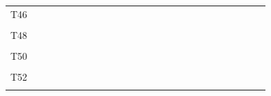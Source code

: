 \documentclass[
]{article}
\begin{document}
\begin{longtable}[l]{lllllllllllllllllllllllll}
\addlinespace
T46 &  &  &  &  &  &  &  &  &  &  &  &  &  &  &  &  &  &  &  &  &  &  &  & \\
\cellcolor{gray!6}{T47} & \cellcolor{gray!6}{} & \cellcolor{gray!6}{} & \cellcolor{gray!6}{} & \cellcolor{gray!6}{} & \cellcolor{gray!6}{} & \cellcolor{gray!6}{} & \cellcolor{gray!6}{} & \cellcolor{gray!6}{} & \cellcolor{gray!6}{} & \cellcolor{gray!6}{} & \cellcolor{gray!6}{} & \cellcolor{gray!6}{} & \cellcolor{gray!6}{} & \cellcolor{gray!6}{} & \cellcolor{gray!6}{} & \cellcolor{gray!6}{} & \cellcolor{gray!6}{} & \cellcolor{gray!6}{} & \cellcolor{gray!6}{} & \cellcolor{gray!6}{} & \cellcolor{gray!6}{} & \cellcolor{gray!6}{} & \cellcolor{gray!6}{} & \cellcolor{gray!6}{}\\
T48 &  &  &  &  &  &  &  &  &  &  &  &  &  &  &  &  &  &  &  &  &  &  &  & \\
\cellcolor{gray!6}{T49} & \cellcolor{gray!6}{} & \cellcolor{gray!6}{} & \cellcolor{gray!6}{} & \cellcolor{gray!6}{} & \cellcolor{gray!6}{} & \cellcolor{gray!6}{} & \cellcolor{gray!6}{} & \cellcolor{gray!6}{} & \cellcolor{gray!6}{} & \cellcolor{gray!6}{} & \cellcolor{gray!6}{} & \cellcolor{gray!6}{} & \cellcolor{gray!6}{} & \cellcolor{gray!6}{} & \cellcolor{gray!6}{} & \cellcolor{gray!6}{} & \cellcolor{gray!6}{} & \cellcolor{gray!6}{} & \cellcolor{gray!6}{} & \cellcolor{gray!6}{} & \cellcolor{gray!6}{} & \cellcolor{gray!6}{} & \cellcolor{gray!6}{} & \cellcolor{gray!6}{}\\
T50 &  &  &  &  &  &  &  &  &  &  &  &  &  &  &  &  &  &  &  &  &  &  &  & \\
\addlinespace
\cellcolor{gray!6}{T51} & \cellcolor{gray!6}{} & \cellcolor{gray!6}{} & \cellcolor{gray!6}{} & \cellcolor{gray!6}{} & \cellcolor{gray!6}{} & \cellcolor{gray!6}{} & \cellcolor{gray!6}{} & \cellcolor{gray!6}{} & \cellcolor{gray!6}{} & \cellcolor{gray!6}{} & \cellcolor{gray!6}{} & \cellcolor{gray!6}{} & \cellcolor{gray!6}{} & \cellcolor{gray!6}{} & \cellcolor{gray!6}{} & \cellcolor{gray!6}{} & \cellcolor{gray!6}{} & \cellcolor{gray!6}{} & \cellcolor{gray!6}{} & \cellcolor{gray!6}{} & \cellcolor{gray!6}{} & \cellcolor{gray!6}{} & \cellcolor{gray!6}{} & \cellcolor{gray!6}{}\\
T52 &  &  &  &  &  &  &  &  &  &  &  &  &  &  &  &  &  &  &  &  &  &  &  & \\
\cellcolor{gray!6}{T53} & \cellcolor{gray!6}{} & \cellcolor{gray!6}{} & \cellcolor{gray!6}{} & \cellcolor{gray!6}{} & \cellcolor{gray!6}{} & \cellcolor{gray!6}{} & \cellcolor{gray!6}{} & \cellcolor{gray!6}{} & \cellcolor{gray!6}{} & \cellcolor{gray!6}{} & \cellcolor{gray!6}{} & \cellcolor{gray!6}{} & \cellcolor{gray!6}{} & \cellcolor{gray!6}{} & \cellcolor{gray!6}{} & \cellcolor{gray!6}{} & \cellcolor{gray!6}{} & \cellcolor{gray!6}{} & \cellcolor{gray!6}{} & \cellcolor{gray!6}{} & \cellcolor{gray!6}{} & \cellcolor{gray!6}{} & \cellcolor{gray!6}{} & \cellcolor{gray!6}{}\\

\end{longtable}
\end{document}
